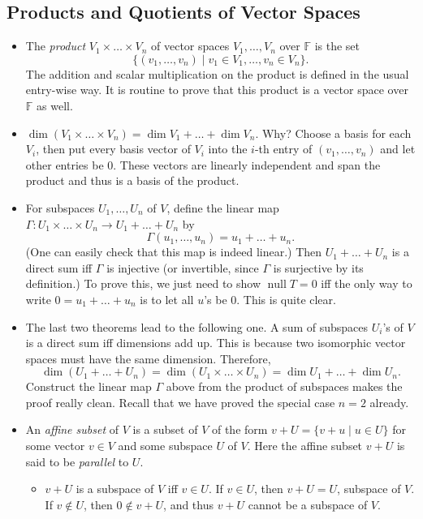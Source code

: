 \documentclass{article}
\newcommand{\F}{\mathbb{F}}
\newcommand{\n}{\operatorname{null}}
\renewcommand{\d}{\dim}
\begin{document}
\subsection{Products and Quotients of Vector Spaces}
\begin{itemize}
    \item The \textit{product} $V_1 \times \dots \times V_n$ of vector spaces $V_1,\dots,V_n$ over $\F$ is the set $$\{(v_1,\dots,v_n) \mid v_1 \in V_1,\dots, v_n \in V_n\}.$$ The addition and scalar multiplication on the product is defined in the usual entry-wise way. It is routine to prove that this product is a vector space over $\F$ as well.
    \item $\d (V_1\times \dots \times V_n) = \d V_1 + \dots + \d V_n$. Why? Choose a basis for each $V_i$, then put every basis vector of $V_i$ into the $i$-th entry of $(v_1,\dots,v_n)$ and let other entries be 0. These vectors are linearly independent and span the product and thus is a basis of the product.
    \item For subspaces $U_1,\dots,U_n$ of $V$, define the linear map $\Gamma: U_1 \times \dots \times U_n \to U_1 + \dots + U_n$ by $$\Gamma(u_1,\dots,u_n) = u_1+\dots+u_n.$$ (One can easily check that this map is indeed linear.) Then $U_1+\dots+U_n$ is a direct sum iff $\Gamma$ is injective (or invertible, since $\Gamma$ is surjective by its definition.) To prove this, we just need to show $\n T = {0}$ iff the only way to write $0 = u_1+\dots+u_n$ is to let all $u$'s be 0. This is quite clear.
    \item The last two theorems lead to the following one. A sum of subspaces $U_i$'s of $V$ is a direct sum iff dimensions add up. This is because two isomorphic vector spaces must have the same dimension. Therefore, $$\d (U_1+\dots+U_n) = \d (U_1 \times \dots \times U_n) = \d U_1 + \dots + \d U_n.$$
    Construct the linear map $\Gamma$ above from the product of subspaces makes the proof really clean. Recall that we have proved the special case $n=2$ already.
    \item An \textit{affine subset} of $V$ is a subset of $V$ of the form $v+U = \{v+u \mid u \in U\}$ for some vector $v \in V$ and some subspace $U$ of $V$. Here the affine subset $v+U$ is said to be \textit{parallel} to $U$.
    \begin{itemize}
        \item $v+U$ is a subspace of $V$ iff $v \in U$. If $v \in U$, then $v+U = U$, subspace of $V$. If $v \notin U$, then $0 \notin v+U$, and thus $v+U$ cannot be a subspace of $V$.

\end{itemize}
\end{itemize}
\end{document}
